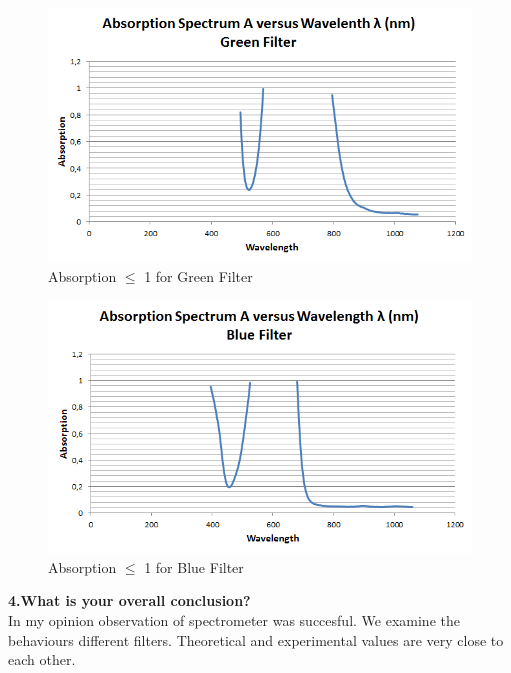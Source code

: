 \documentclass[a4paper,12pt]{report}
\begin{document}
\begin{figure}[h!]
\centering
\includegraphics[width=1.0\linewidth, height=0.4\textheight]{A-Green}
\caption{Absorption $\leq$ 1 for Green Filter}
\label{fig:A-Green}
\end{figure}
\begin{figure}[h!]
\centering
\includegraphics[width=1.0\linewidth, height=0.4\textheight]{A-Blue}
\caption{Absorption $\leq$ 1 for Blue Filter}
\label{fig:A-Blue}
\end{figure}
\textbf{4.What is your overall conclusion?}\\
In my opinion observation of spectrometer was succesful. We examine the behaviours different filters. Theoretical and experimental values are very close to each other.  
\end{document}
